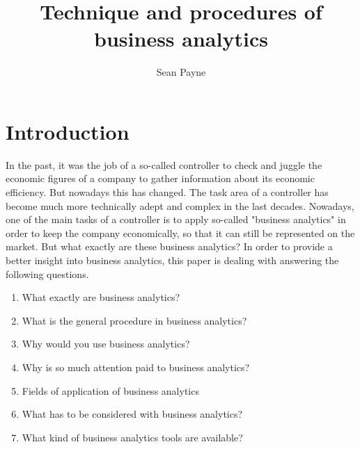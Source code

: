 \documentclass[12pt,twocolumn,twoside]{conference}   %
\title{Technique and procedures of business analytics}
\author{Sean Payne}
\begin{document}
\section{Introduction}
In the past, it was the job of a so-called controller to check and juggle the economic figures of a company to gather information about its economic efficiency. But nowadays this has changed. The task area of a controller has become much more technically adept and complex in the last decades. Nowadays, one of the main tasks of a controller is to apply so-called "business analytics" in order to keep the company economically, so that it can still be represented on the market. But what exactly are these business analytics? In order to provide a better insight into business analytics, this paper is dealing with answering the following questions.

\begin{enumerate}
\item What exactly are business analytics?
\item What is the general procedure in business analytics?
\item Why would you use business analytics?
\item Why is so much attention paid to business analytics?
\item Fields of application of business analytics
\item What has to be considered with business analytics?
\item What kind of business analytics tools are available?
\end{enumerate}
\end{document}
